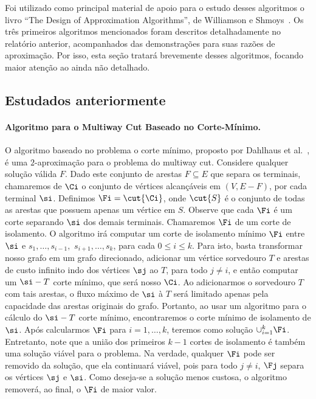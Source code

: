 \documentclass[12pt, a4paper]{article}
\begin{document}
Foi utilizado como principal material de apoio para o estudo desses algoritmos o livro ``The Design of Approximation Algorithms'', de Williamson e Shmoys~\cite{WS11}. 
Os três primeiros algoritmos mencionados foram descritos detalhadamente no relatório anterior, acompanhados das demonstrações para suas razões de aproximação. Por isso, esta seção tratará brevemente desses algoritmos, focando maior atenção ao ainda não detalhado.



\subsection{Estudados anteriormente}
\paragraph{Algoritmo para o Multiway Cut Baseado no Corte-Mínimo.}
O algoritmo baseado no problema o corte mínimo, proposto por Dahlhaus et al.~\cite{DJPSY1994}, é uma $2$-aproximação para o problema do multiway cut.
%
Considere qualquer solução válida $F$. Dado este conjunto de arestas $F \subseteq E$ que separa os terminais, chamaremos de $\Ci$ o conjunto de vértices alcançáveis em $(V, E-F)$, por cada terminal $\si$. 
Definimos $\Fi = \cut{\Ci}$, onde $\cut{S}$ é o conjunto de todas as arestas que possuem apenas um vértice em $S$.
Observe que cada $\Fi$ é um corte separando $\si$ dos demais terminais. Chamaremos $\Fi$ de um corte de isolamento.
%
O algoritmo irá computar um corte de isolamento mínimo $\Fi$ entre $\si$ e $s_{1}, \dots, s_{i-1},$ $s_{i+1}, \dots, s_{k}$, para cada $0 \leq i \leq k$.
Para isto, basta transformar nosso grafo em um grafo direcionado, adicionar um vértice sorvedouro $T$ e arestas de custo infinito indo dos vértices $\sj$ ao $T$, para todo $j \ne i$, e então computar um $\si - T$ corte mínimo, que será nosso $\Ci$.
%
Ao adicionarmos o sorvedouro $T$ com tais arestas, o fluxo máximo de $\si$ à $T$ será limitado apenas pela capacidade das arestas originais do grafo. Portanto, ao usar um algoritmo para o cálculo do $\si - T$ corte mínimo, encontraremos o corte mínimo de isolamento de $\si$. 
%
Após calcularmos $\Fi$ para $i = 1, \dots, k$, teremos como solução $\cup_{i = 1}^{k} \Fi$.
Entretanto, note que a união dos primeiros $k-1$ cortes de isolamento é também uma solução viável para o problema. 
Na verdade, qualquer $\Fi$ pode ser removido da solução, que ela continuará viável, pois para todo $j \ne i$, $\Fj$ separa os vértices $\sj$ e $\si$. Como deseja-se a solução menos custosa, o algoritmo removerá, ao final,  o $\Fi$ de maior valor.
\end{document}
